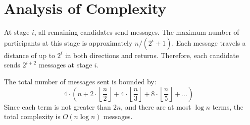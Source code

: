 \documentclass{article}
\begin{document}
\section{Analysis of Complexity}
At stage $i$, all remaining candidates send messages. The maximum number of participants at this stage is approximately $n / (2^i + 1)$. Each message travels a distance of up to $2^i$ in both directions and returns. Therefore, each candidate sends $2^{i+2}$ messages at stage $i$.

The total number of messages sent is bounded by:
\[ 4 \cdot \left(n + 2 \cdot \left\lfloor \frac{n}{2} \right\rfloor + 4 \cdot \left\lfloor \frac{n}{3} \right\rfloor + 8 \cdot \left\lfloor \frac{n}{5} \right\rfloor + \dots \right) \]
Since each term is not greater than $2n$, and there are at most $\log n$ terms, the total complexity is $O(n \log n)$ messages.

\printbibliography
\end{document}
